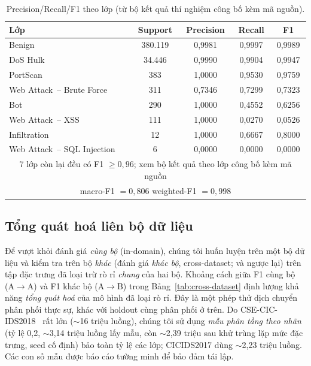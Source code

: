 \documentclass[conference]{IEEEtran}
\begin{document}
\begin{table}[htbp]
  \caption{Precision/Recall/F1 theo lớp (từ bộ kết quả thí nghiệm công bố kèm mã nguồn).}
  \label{tab:perclass}
  \centering
  \begin{tabular}{lcccc}
    \toprule
    Lớp & Support & Precision & Recall & F1 \\
    \midrule
    Benign & 380.119 & 0,9981 & 0,9997 & 0,9989 \\
    DoS Hulk & 34.446 & 0,9990 & 0,9904 & 0,9947 \\
    PortScan & 383 & 1,0000 & 0,9530 & 0,9759 \\
    Web Attack~-- Brute Force & 311 & 0,7346 & 0,7299 & 0,7323 \\
    Bot & 290 & 1,0000 & 0,4552 & 0,6256 \\
    Web Attack~-- XSS & 111 & 1,0000 & 0,0270 & 0,0526 \\
    Infiltration & 12 & 1,0000 & 0,6667 & 0,8000 \\
    Web Attack~-- SQL Injection & 6 & 0,0000 & 0,0000 & 0,0000 \\
    \multicolumn{5}{c}{\footnotesize 7 lớp còn lại đều có F1 $\geq 0{,}96$; xem bộ kết quả theo lớp công bố kèm mã nguồn} \\
    \multicolumn{5}{c}{\footnotesize macro-F1 $=0{,}806$ \quad weighted-F1 $=0{,}998$} \\
    \bottomrule
  \end{tabular}
\end{table}

\subsection{Tổng quát hoá liên bộ dữ liệu}
\label{sec:cross-dataset}

Để vượt khỏi đánh giá \emph{cùng bộ} (in-domain), chúng tôi huấn luyện trên một bộ dữ liệu và kiểm tra trên bộ \emph{khác} (đánh giá \emph{khác bộ}, cross-dataset; và ngược lại) trên tập đặc trưng đã loại trừ rò rỉ \emph{chung} của hai bộ. Khoảng cách giữa F1 cùng bộ (A$\to$A) và F1 khác bộ (A$\to$B) trong Bảng~\ref{tab:cross-dataset} định lượng khả năng \emph{tổng quát hoá} của mô hình đã loại rò rỉ. Đây là một phép thử dịch chuyển phân phối thực sự, khác với holdout cùng phân phối ở trên. Do CSE-CIC-IDS2018~\cite{csecicids2018} rất lớn ($\sim$16 triệu luồng), chúng tôi sử dụng \emph{mẫu phân tầng theo nhãn} (tỷ lệ 0{,}2, $\sim$3{,}14 triệu luồng lấy mẫu, còn $\sim$2{,}39 triệu sau khử trùng lặp mức đặc trưng, seed cố định) bảo toàn tỷ lệ các lớp; CICIDS2017 dùng $\sim$2{,}23 triệu luồng. Các con số mẫu được báo cáo tường minh để bảo đảm tái lập.
\end{document}
